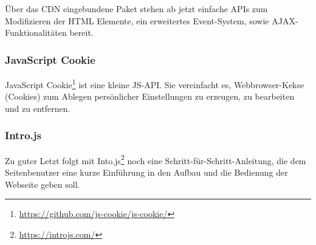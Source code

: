 Über das \ac{CDN} eingebundene Paket stehen ab jetzt einfache \aclp{API} zum Modifizieren der \acs{HTML} Elemente, ein erweitertes Event-System, sowie \acs{AJAX}-Funktionalitäten bereit.

\subsubsection{JavaScript Cookie}
JavaScript Cookie\footnote{\url{https://github.com/js-cookie/js-cookie/}} ist eine kleine \acl{JS}-\ac{API}.
Sie vereinfacht es, Webbrowser-Kekse (Cookies) zum Ablegen persönlicher Einstellungen zu erzeugen, zu bearbeiten und zu entfernen.

\subsubsection{Intro.js}
Zu guter Letzt folgt mit Into.js\footnote{\url{https://introjs.com/}} noch eine Schritt-für-Schritt-Anleitung, die dem Seitenbenutzer eine kurze Einführung in den Aufbau und die Bedienung der Webseite geben soll.
